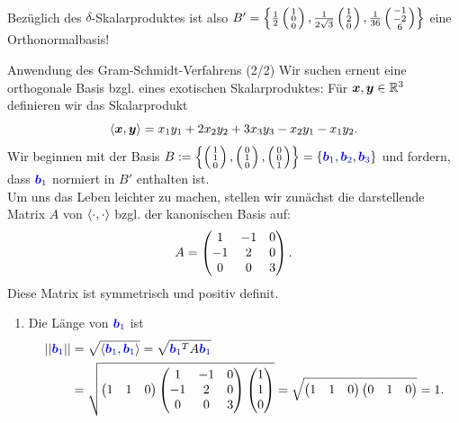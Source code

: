 \begin{Beispiel}
\begin{enumerate}
\begin{align*}
    \end{align*}
\end{enumerate}
Bezüglich des $\delta$-Skalarproduktes ist also $B'=\left\{\frac{1}{2}\left(\begin{smallmatrix}1\\0\\0\end{smallmatrix}\right),\frac{1}{2\sqrt{3}}\left(\begin{smallmatrix}1\\2\\0\end{smallmatrix}\right),\\\frac{1}{36}\left(\begin{smallmatrix}-1\\-2\\6\end{smallmatrix}\right)\right\}$ eine Orthonormalbasis!
\end{Beispiel}

\begin{Beispiel}
{Anwendung des Gram-Schmidt-Verfahrens (2/2)}
Wir suchen erneut eine orthogonale Basis bzgl. eines exotischen Skalarproduktes:
Für ${{\text{\boldmath${x}$}}},{{\text{\boldmath${y}$}}}\in\mathbb{R}^3$ definieren wir das Skalarprodukt
\begin{equation*}
    \left\langle{{\text{\boldmath${x}$}}},{{\text{\boldmath${y}$}}}\right\rangle=x_1y_1+2x_2y_2+3x_3y_3-x_2y_1-x_1y_2.
\end{equation*}
Wir beginnen mit der Basis $B:=\left\{\left(\begin{smallmatrix}1\\1\\0\end{smallmatrix}\right),\left(\begin{smallmatrix}0\\1\\0\end{smallmatrix}\right),\left(\begin{smallmatrix}0\\0\\1\end{smallmatrix}\right)\right\}=\left\{\textcolor{blue}{{{\text{\boldmath${b}$}}}_1},\textcolor{blue}{{{\text{\boldmath${b}$}}}_2},\textcolor{blue}{{{\text{\boldmath${b}$}}}_3}\right\}$ und fordern, dass $\textcolor{blue}{{{\text{\boldmath${b}$}}}_1}$ normiert in $B'$ enthalten ist.\\
Um uns das Leben leichter zu machen, stellen wir zunächst die darstellende Matrix $A$ von $\left\langle\cdot,\cdot\right\rangle$ bzgl. der kanonischen Basis auf:
\begin{equation*}
    A=\begin{pmatrix}1&-1&0\\-1&2&0\\0&0&3\end{pmatrix}.
\end{equation*}
Diese Matrix ist symmetrisch und positiv definit.
\begin{enumerate}
    \item Die Länge von $\textcolor{blue}{{{\text{\boldmath${b}$}}}_1}$ ist
    \begin{align*}
        \Norm{\textcolor{blue}{\bvec_1}}&=\sqrt{\BiFo{\textcolor{blue}{\bvec_1},\textcolor{blue}{\bvec_1}}}=\sqrt{\textcolor{blue}{\bvec_1}^TA\textcolor{blue}{\bvec_1}}\\
        &=\sqrt{\Matrix{1&1&0}\Matrix{1&-1&0\\-1&2&0\\0&0&3}\Matrix{1\\1\\0}}=\sqrt{\Matrix{1&1&0}\Matrix{0&1&0}}=1.

\end{align*}
\end{enumerate}
\end{Beispiel}
